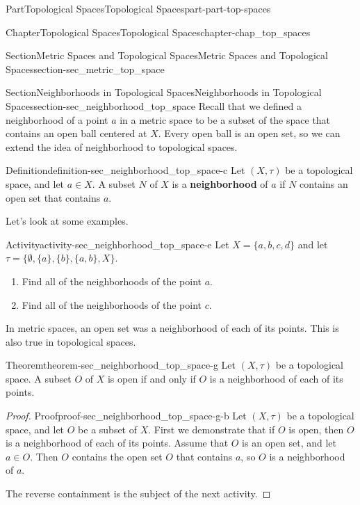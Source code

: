 \documentclass[oneside,10pt,]{book}
\newcommand{\terminology}[1]{\textbf{#1}}
\numberwithin{equation}{chapter}
\begin{document}
\begin{partptx}{Part}{Topological Spaces}{}{Topological Spaces}{}{}{part-part-top-spaces}
\begin{chapterptx}{Chapter}{Topological Spaces}{}{Topological Spaces}{}{}{chapter-chap_top_spaces}
\begin{sectionptx}{Section}{Metric Spaces and Topological Spaces}{}{Metric Spaces and Topological Spaces}{}{}{section-sec_metric_top_space}
\end{sectionptx}
%
%
\typeout{************************************************}
\typeout{************************************************}
%
\begin{sectionptx}{Section}{Neighborhoods in Topological Spaces}{}{Neighborhoods in Topological Spaces}{}{}{section-sec_neighborhood_top_space}
Recall that we defined a neighborhood of a point \(a\) in a metric space to be a subset of the space that contains an open ball centered at \(X\). Every open ball is an open set, so we can extend the idea of neighborhood to topological spaces.%
\begin{definition}{Definition}{}{definition-sec_neighborhood_top_space-c}%
%
Let \((X, \tau)\) be a topological space, and let \(a \in X\). A subset \(N\) of \(X\) is a \terminology{neighborhood} of \(a\) if \(N\) contains an open set that contains \(a\).%
\end{definition}
Let's look at some examples.%
\begin{activity}{Activity}{}{activity-sec_neighborhood_top_space-e}%
Let \(X = \{a,b,c,d\}\) and let \(\tau = \{\emptyset, \{a\}, \{b\}, \{a,b\}, X \}\).%
\begin{enumerate}[font=\bfseries,label=(\alph*),ref=\alph*]%
\item{}Find all of the neighborhoods of the point \(a\).%
\item{}Find all of the neighborhoods of the point \(c\).%
\end{enumerate}%
\end{activity}%
In metric spaces, an open set was a neighborhood of each of its points. This is also true in topological spaces.%
\begin{theorem}{Theorem}{}{}{theorem-sec_neighborhood_top_space-g}%
Let \((X, \tau)\) be a topological space. A subset \(O\) of \(X\) is open if and only if \(O\) is a neighborhood of each of its points.%
\end{theorem}
\begin{proof}{Proof}{}{proof-sec_neighborhood_top_space-g-b}
Let \((X, \tau)\) be a topological space, and let \(O\) be a subset of \(X\). First we demonstrate that if \(O\) is open, then \(O\) is a neighborhood of each of its points. Assume that \(O\) is an open set, and let \(a \in O\). Then \(O\) contains the open set \(O\) that contains \(a\), so \(O\) is a neighborhood of \(a\).%
\par
The reverse containment is the subject of the next activity.%

\end{proof}
\end{sectionptx}
\end{chapterptx}
\end{partptx}
\end{document}
